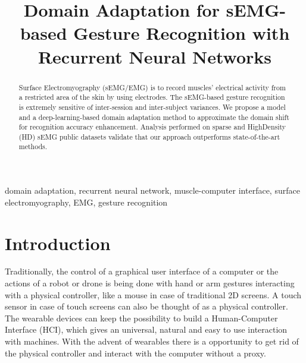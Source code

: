 \documentclass[conference]{IEEEtran}
\begin{document}
\title{Domain Adaptation for sEMG-based Gesture Recognition with Recurrent Neural Networks}

\author{
}

\maketitle


\begin{abstract}
Surface Electromyography (sEMG/EMG) is to record muscles' electrical activity from a restricted area of the skin by using electrodes. The sEMG-based gesture recognition is extremely sensitive of inter-session and inter-subject variances. We propose a model and a deep-learning-based domain adaptation method to approximate the domain shift for recognition accuracy enhancement. Analysis performed on sparse and HighDensity (HD) sEMG public datasets validate that our approach outperforms state-of-the-art methods.
\end{abstract}

\begin{IEEEkeywords}
domain adaptation, recurrent neural network, muscle-computer interface, surface electromyography, EMG, gesture recognition
\end{IEEEkeywords}

\section{Introduction} \label{sec:introduction}
\IEEEpubidadjcol
Traditionally, the control of a graphical user interface of a computer or the actions of a robot or drone is being done with hand or arm gestures interacting with a physical controller, like a mouse in case of traditional 2D screens. A touch sensor in case of touch screens can also be thought of as a physical controller. The wearable devices can keep the possibility to build a Human-Computer Interface (HCI), which gives an universal, natural and easy to use interaction with machines. With the advent of wearables there is a opportunity to get rid of the physical controller and interact with the computer without a proxy.
\end{document}
